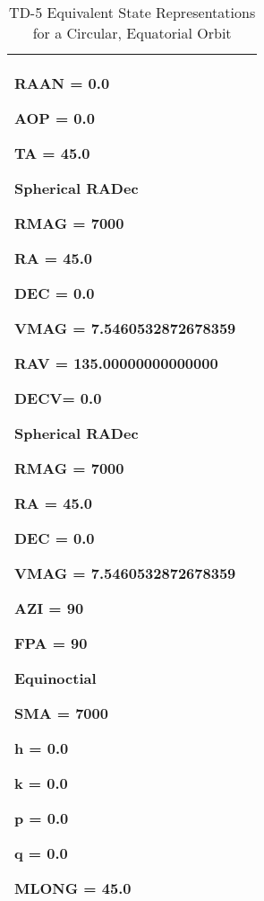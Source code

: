 \begin{table}[htbp!]
\begin{tabular}{|p{1.0 in} |p{5.0 in} |}
\begin{compactenum}
\begin{compactenum}
                  \item RAAN = 0.0
                  \item AOP = 0.0
                  \item TA = 45.0
              \end{compactenum}
              \item Spherical RADec
               \begin{compactenum}
                  \item RMAG = 7000
                  \item RA = 45.0
                  \item DEC = 0.0
                  \item VMAG = 7.5460532872678359 
                  \item RAV = 135.00000000000000
                  \item DECV= 0.0
              \end{compactenum}
              \item Spherical RADec
               \begin{compactenum}
                  \item RMAG = 7000
                  \item RA = 45.0
                  \item DEC = 0.0
                  \item VMAG = 7.5460532872678359 
                  \item AZI = 90
                  \item FPA = 90
              \end{compactenum}
              \item Equinoctial
               \begin{compactenum}
                  \item SMA = 7000
                  \item h = 0.0
                  \item k = 0.0
                  \item p = 0.0
                  \item q = 0.0
                  \item MLONG = 45.0
              \end{compactenum}
          \end{compactenum}\\
         \hline
\end{tabular}
   \label{Table:TD-5}
   \caption{TD-5 Equivalent State Representations for a Circular, Equatorial Orbit}
\end{table} 
